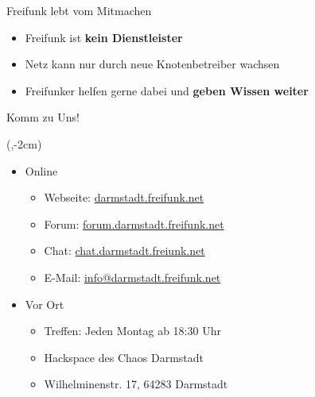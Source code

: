 \documentclass[t]{beamer}
\begin{document}
  \begin{frame}{Freifunk lebt vom Mitmachen}
    \begin{itemize}
      \item Freifunk ist \textbf{kein Dienstleister}
      \item Netz kann nur durch neue Knotenbetreiber wachsen
      \item Freifunker helfen gerne dabei und \textbf{geben Wissen weiter}
    \end{itemize}
  \end{frame}

  \begin{frame}{Komm zu Uns!}
    \begin{textblock*}{0cm}(\textwidth-2cm,-2cm)
      \begin{figure}[h]
        \def\svgwidth{2.5cm}
        
      \end{figure}
    \end{textblock*}
    \begin{itemize}
      \item Online
      \begin{itemize}
        \item Webseite: \href{https://darmstadt.freifunk.net}{darmstadt.freifunk.net}
        \item Forum: \href{https://forum.darmstadt.freifunk.net}{forum.darmstadt.freifunk.net}
        \item Chat: \href{https://chat.darmstadt.freifunk.net}{chat.darmstadt.freiunk.net}
        \item E-Mail: \href{mailto:info@darmstadt.freifunk.net}{info@darmstadt.freifunk.net}
        \end{itemize}
      \item Vor Ort
      \begin{itemize}
      	\item Treffen: Jeden Montag ab 18:30 Uhr
        \item Hackspace des Chaos Darmstadt
        \item Wilhelminenstr. 17, 64283 Darmstadt
      \end{itemize}
    \end{itemize}
  \end{frame}
\end{document}
